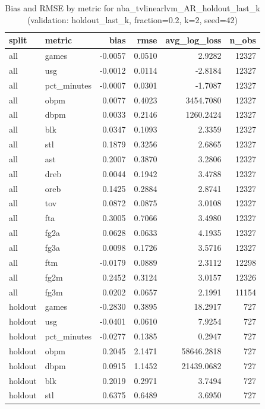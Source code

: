 \begin{table}
\caption{Bias and RMSE by metric for nba_tvlinearlvm_AR_holdout_last_k (validation: holdout_last_k, fraction=0.2, k=2, seed=42)}
\label{tab:nba_tvlinearlvm_AR_holdout_last_k_vs_holdout_last_k_f20_k2_s42_bias_rmse}
\begin{tabular}{llrrrr}
\toprule
split & metric & bias & rmse & avg\_log\_loss & n\_obs \\
\midrule
all & games & -0.0057 & 0.0510 & 2.9282 & 12327 \\
all & usg & -0.0012 & 0.0114 & -2.8184 & 12327 \\
all & pct\_minutes & -0.0007 & 0.0301 & -1.7087 & 12327 \\
all & obpm & 0.0077 & 0.4023 & 3454.7080 & 12327 \\
all & dbpm & 0.0033 & 0.2146 & 1260.2424 & 12327 \\
all & blk & 0.0347 & 0.1093 & 2.3359 & 12327 \\
all & stl & 0.1879 & 0.3256 & 2.6865 & 12327 \\
all & ast & 0.2007 & 0.3870 & 3.2806 & 12327 \\
all & dreb & 0.0044 & 0.1942 & 3.4788 & 12327 \\
all & oreb & 0.1425 & 0.2884 & 2.8741 & 12327 \\
all & tov & 0.0872 & 0.0875 & 3.0108 & 12327 \\
all & fta & 0.3005 & 0.7066 & 3.4980 & 12327 \\
all & fg2a & 0.0628 & 0.0633 & 4.1935 & 12327 \\
all & fg3a & 0.0098 & 0.1726 & 3.5716 & 12327 \\
all & ftm & -0.0179 & 0.0889 & 2.3112 & 12298 \\
all & fg2m & 0.2452 & 0.3124 & 3.0157 & 12326 \\
all & fg3m & 0.0202 & 0.0657 & 2.1991 & 11154 \\
holdout & games & -0.2830 & 0.3895 & 18.2917 & 727 \\
holdout & usg & -0.0401 & 0.0610 & 7.9254 & 727 \\
holdout & pct\_minutes & -0.0277 & 0.1385 & 0.2947 & 727 \\
holdout & obpm & 0.2045 & 2.1471 & 58646.2818 & 727 \\
holdout & dbpm & 0.0915 & 1.1452 & 21439.0682 & 727 \\
holdout & blk & 0.2019 & 0.2971 & 3.7494 & 727 \\
holdout & stl & 0.6375 & 0.6489 & 3.6950 & 727 \\

\end{tabular}
\end{table}
